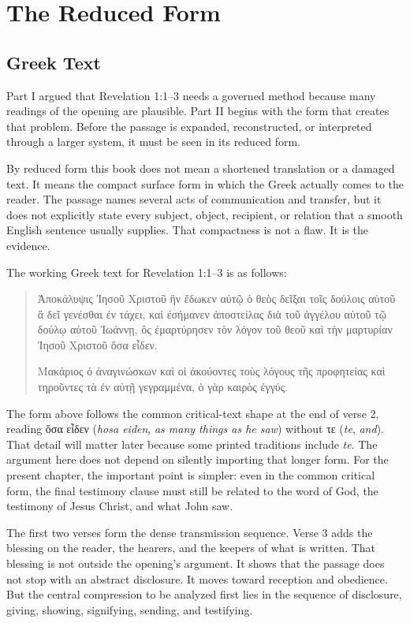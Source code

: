 \chapter{The Reduced Form}

\section{Greek Text}

Part I argued that Revelation 1:1--3 needs a governed method because many readings of the opening are plausible. Part II begins with the form that creates that problem. Before the passage is expanded, reconstructed, or interpreted through a larger system, it must be seen in its reduced form.

By reduced form this book does not mean a shortened translation or a damaged text. It means the compact surface form in which the Greek actually comes to the reader. The passage names several acts of communication and transfer, but it does not explicitly state every subject, object, recipient, or relation that a smooth English sentence usually supplies. That compactness is not a flaw. It is the evidence.

The working Greek text for Revelation 1:1--3 is as follows:

\begin{quote}
\textgreek{Ἀποκάλυψις Ἰησοῦ Χριστοῦ ἣν ἔδωκεν αὐτῷ ὁ θεὸς δεῖξαι τοῖς δούλοις αὐτοῦ ἃ δεῖ γενέσθαι ἐν τάχει, καὶ ἐσήμανεν ἀποστείλας διὰ τοῦ ἀγγέλου αὐτοῦ τῷ δούλῳ αὐτοῦ Ἰωάννῃ, ὃς ἐμαρτύρησεν τὸν λόγον τοῦ θεοῦ καὶ τὴν μαρτυρίαν Ἰησοῦ Χριστοῦ ὅσα εἶδεν.}

\textgreek{Μακάριος ὁ ἀναγινώσκων καὶ οἱ ἀκούοντες τοὺς λόγους τῆς προφητείας καὶ τηροῦντες τὰ ἐν αὐτῇ γεγραμμένα, ὁ γὰρ καιρὸς ἐγγύς.}
\end{quote}

The form above follows the common critical-text shape at the end of verse 2, reading \textgreek{ὅσα εἶδεν} (\textit{hosa eiden}, \textit{as many things as he saw}) without \textgreek{τε} (\textit{te}, \textit{and}). That detail will matter later because some printed traditions include \textit{te}. The argument here does not depend on silently importing that longer form. For the present chapter, the important point is simpler: even in the common critical form, the final testimony clause must still be related to the word of God, the testimony of Jesus Christ, and what John saw.

The first two verses form the dense transmission sequence. Verse 3 adds the blessing on the reader, the hearers, and the keepers of what is written. That blessing is not outside the opening's argument. It shows that the passage does not stop with an abstract disclosure. It moves toward reception and obedience. But the central compression to be analyzed first lies in the sequence of disclosure, giving, showing, signifying, sending, and testifying.

